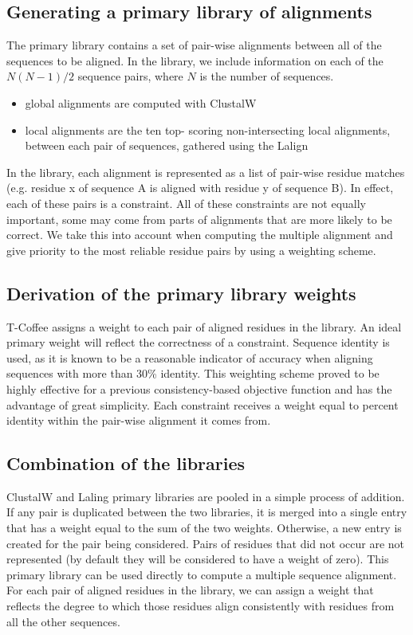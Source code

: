 \subsection{Generating a primary library of alignments}
The primary library contains a set of pair-wise alignments between all of the sequences to be aligned. 
In the library, we include information on each of the $N(N - 1)/2$ sequence pairs, where $N$ is the number of sequences. 
\begin{itemize}
\item global alignments are computed with ClustalW
\item  local alignments are the ten top- scoring non-intersecting local alignments, between each pair of sequences, gathered using the Lalign
\end{itemize}
In the library, each alignment is represented as a list of pair-wise residue matches (e.g. residue x of sequence A is aligned with residue y of sequence B). In effect, each of these pairs is a constraint. All of these constraints are not equally important, some may come from parts of alignments that are more likely to be correct. We take this into account when computing the multiple alignment and give priority to the most reliable residue pairs by using a weighting scheme.

\subsection{Derivation of the primary library weights}
T-Coffee assigns a weight to each pair of aligned residues in the library. An ideal primary weight will reflect the correctness of a constraint. Sequence identity is used, as it is known to be a reasonable indicator of accuracy when aligning sequences with more than 30\% identity. This weighting scheme proved to be highly effective for a previous consistency-based objective function and has the advantage of great simplicity. 
Each constraint receives a weight equal to percent identity within the pair-wise alignment it comes from.

\subsection{Combination of the libraries}
ClustalW and Laling primary libraries are pooled in a simple process of addition. 
If any pair is duplicated between the two libraries, it is merged into a single entry that has a weight equal to the sum of the two weights. Otherwise, a new entry is created for the pair being considered. 
Pairs of residues that did not occur are not represented (by default they will be considered to have a weight of zero).
This primary library can be used directly to compute a multiple sequence alignment. 
For each pair of aligned residues in the library, we can assign a weight that reflects the degree to which those residues align consistently with residues from all the other sequences.

